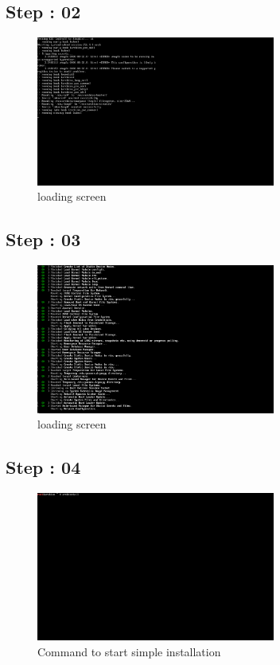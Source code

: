 \documentclass{article}
\begin{document}
\subsection{Step : 02}
\begin{figure}[H]
    \centering
    \includegraphics[width=0.7\textwidth]{2.png}
    \caption{loading screen}
    \label{fig:install_Arch2}
\end{figure}

\subsection{Step : 03}
\begin{figure}[H]
    \centering
    \includegraphics[width=0.7\textwidth]{3.png}
    \caption{loading screen}
    \label{fig:install_Arch3}
\end{figure}

\subsection{Step : 04}
\begin{figure}[H]
    \centering
    \includegraphics[width=0.7\textwidth]{4.png}
    \caption{Command to start simple installation}
    \label{fig:install_Arch4}
\end{figure}
\end{document}
